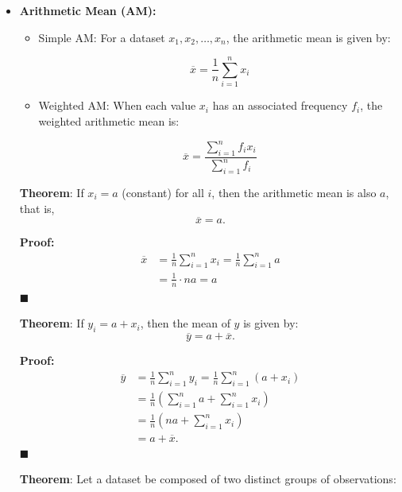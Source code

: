\documentclass[twoside]{book}
\begin{document}
\begin{itemize}
    \item \textbf{Arithmetic Mean (AM):} 
    \begin{itemize}
        \item Simple AM: For a dataset \( x_1, x_2, \dots, x_n \), the arithmetic mean is given by:
    \begin{textbox}
    \[
    \overline{x} = \dfrac{1}{n} \sum_{i=1}^{n} x_i
    \]
    \end{textbox}
    \item Weighted AM: When each value \( x_i \) has an associated frequency \( f_i \), the weighted arithmetic mean is:
    \begin{textbox}
    \[
    \overline{x} = \dfrac{\sum_{i=1}^{n} f_i x_i}{\sum_{i=1}^{n} f_i}
    \]
    \end{textbox}
    \end{itemize}

\begin{textbox}
        \textbf{Theorem}: If \( x_i = a \) (constant) for all \( i \), then the arithmetic mean is also \( a \), that is,
\[
\overline{x} = a.
\]
\end{textbox}

\textbf{Proof:}
\begin{align*}
\overline{x} &= \frac{1}{n} \sum_{i=1}^n x_i 
       = \frac{1}{n} \sum_{i=1}^n a \\
       &= \frac{1}{n} \cdot n a = a
\end{align*}
\hfill $\blacksquare$

\begin{textbox}
\textbf{Theorem}: If \( y_i = a + x_i \), then the mean of \( y \) is given by:
\[
\overline{y} = a + \overline{x}.
\]
\end{textbox}

\textbf{Proof:}
\begin{align*}
\overline{y} &= \frac{1}{n} \sum_{i=1}^n y_i = \frac{1}{n} \sum_{i=1}^n (a + x_i) \\
       &= \frac{1}{n} \left( \sum_{i=1}^n a + \sum_{i=1}^n x_i \right) \\
       &= \frac{1}{n} \left( n a + \sum_{i=1}^n x_i \right) \\
       &= a + \overline{x}.
\end{align*}
\hfill $\blacksquare$

\begin{textbox}
\textbf{Theorem}: Let a dataset be composed of two distinct groups of observations:


\end{textbox}
\end{itemize}
\end{document}
